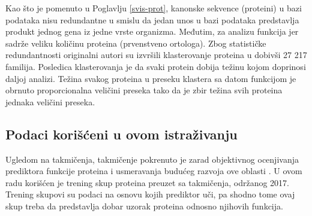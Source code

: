 Kao što je pomenuto u Poglavlju \ref{svis-prot}, kanonske sekvence (proteini) u \swissprot
bazi podataka nisu redundantne u smislu da jedan unos u bazi podataka predstavlja produkt
jednog gena iz jedne vrste organizma. Međutim, za analizu funkcija
\swissprot {} \parencite{Xie2007} jer
sadrže veliku količinu  proteina (prvenstveno ortologa).
Zbog statističke redundantnosti originalni autori su izvršili klasterovanje \swissprot
proteina u  dobivši 27 217 familija. Posledica
klasterovanja je da svaki protein dobija težinu kojom doprinosi daljoj analizi.
Težina svakog proteina u preseku klastera sa datom funkcijom je obrnuto
proporcionalna veličini preseka tako da je zbir težina svih proteina jednaka
veličini preseka.

%

\subsection{Podaci korišćeni u ovom istraživanju}

Ugledom na  takmičenja,   takmičenje pokrenuto je zarad objektivnog ocenjivanja
prediktora funkcije proteina i usmeravanja budućeg razvoja ove oblasti
\parencite{CAFA}.  U ovom radu korišćen je trening skup proteina preuzet sa
 takmičenja, održanog 2017. Trening skupovi su podaci na osnovu
kojih prediktor uči, pa shodno tome ovaj skup treba da predstavlja dobar uzorak
proteina odnosno njihovih funkcija.

